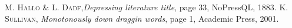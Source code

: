 \renewcommand{\baselinestretch}{1.05}\small\normalsize
\begin{thebibliography}{9}
 \textsc{M. Hallo \& L. Dadf,}\textit{Depressing literature title}, page 33, NoPressQL, 1883.
 \textsc{K. Sullivan}, \textit{Monotonously down draggin words}, page 1, Academic Press, 2001.
\end{thebibliography}


